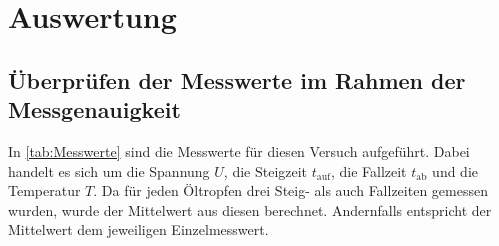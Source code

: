 \section{Auswertung}
\label{sec:Auswertung}

\subsection{Überprüfen der Messwerte im Rahmen der Messgenauigkeit}
In \ref{tab:Messwerte} sind die Messwerte für diesen Versuch aufgeführt. Dabei handelt es sich um die Spannung $U$, 
die Steigzeit $t_{\text{auf}}$, die Fallzeit $t_{\text{ab}}$ und die Temperatur $T$. Da für jeden Öltropfen drei Steig- als auch 
Fallzeiten gemessen wurden, wurde der Mittelwert aus diesen berechnet. Andernfalls entspricht der Mittelwert dem jeweiligen 
Einzelmesswert.

